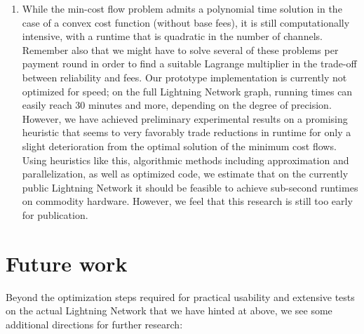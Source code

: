 \documentclass[10pt,twocolumn]{article}
\begin{document}
\begin{enumerate}
\item While the min-cost flow problem admits a polynomial time solution in the case of a convex cost function (without base fees), it is still computationally intensive, with a runtime that is quadratic in the number of channels. Remember also that we might have to solve several of these problems per payment round in order to find a suitable Lagrange multiplier in the trade-off between reliability and fees.
Our prototype implementation is currently not optimized for speed; on the full Lightning Network graph, running times can easily reach 30 minutes and more, depending on the degree of precision. However, we have achieved preliminary experimental results on a promising heuristic that seems to very favorably trade reductions in runtime for only a slight deterioration from the optimal solution of the minimum cost flows.
Using heuristics like this, algorithmic methods including approximation and parallelization, as well as optimized code, we estimate that on the currently public Lightning Network it should be feasible to achieve sub-second runtimes on commodity hardware.
However, we feel that this research is still too early for publication.
\end{enumerate}

\section{Future work}
Beyond the optimization steps required for practical usability and extensive tests on the actual Lightning Network that we have
hinted at above, we see some additional directions for further research:
\end{document}
